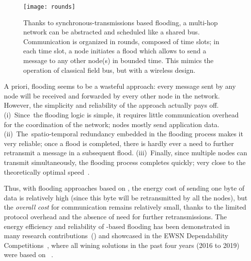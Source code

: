\begin{figure}
  \centering
  \texttt{[image: rounds]}
  \caption{Thanks to synchronous-transmissions based flooding, a multi-hop network can be abstracted and scheduled like a shared bus.
	Communication is organized in rounds, composed of time slots; in each time slot, a node initiates a flood which allows to send a message to any other node(s) in bounded time.\linebreak
	This mimics the operation of classical field bus, but with a wireless design.}
  \label{fig:rounds}
	\vspace{-0.5cm}
\end{figure}

A priori, flooding seems to be a wasteful approach: every message sent by any node will be received and forwarded by every other node in the network.
However, the simplicity and reliability of the approach actually pays off.
\linebreak
(i)~Since~the flooding logic is simple, it requires little communication overhead for the coordination of the network; nodes mostly send application data.
(ii)~The~spatio-temporal redundancy embedded in the flooding process makes it very reliable; once a flood is completed, there is hardly ever a need to further retransmit a message in a subsequent flood.
(iii)~Finally, since multiple nodes can transmit simultaneously, the flooding process completes quickly; very close to the theoretically optimal speed~\cite{ferrari2011Glossy}.

Thus, with flooding approaches based on \ST, the energy cost of sending one byte of data is relatively high (since this byte will be retransmitted by all the nodes), but the \emph{overall cost} for communication remains relatively small, thanks to the limited protocol overhead and the absence of need for further retransmissions.
The energy efficiency and reliability of \ST-based flooding has been demonstrated in many research contributions~(\eg \cite{ferrari2011Glossy, landsiedel2013Chaos, herrmann2018Mixer}) and showcased in the EWSN Dependability Competitions~\cite{schuss2017Competition}, where all wining solutions in the past four years (2016 to 2019) were based on \ST~\cite{escobar2018Competition, sommer2016Competition,lim2017Competition, escobar2019RedNodeBus, ma2019DeCoT}.


